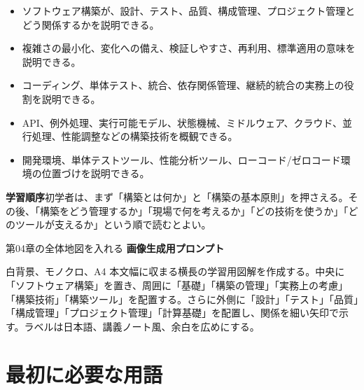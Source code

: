 \documentclass[a4paper,11pt,ja=standard,xelatex]{bxjsarticle}
\begin{document}
\begin{itemize}
  \item ソフトウェア構築が、設計、テスト、品質、構成管理、プロジェクト管理とどう関係するかを説明できる。
  \item 複雑さの最小化、変化への備え、検証しやすさ、再利用、標準適用の意味を説明できる。
  \item コーディング、単体テスト、統合、依存関係管理、継続的統合の実務上の役割を説明できる。
  \item API、例外処理、実行可能モデル、状態機械、ミドルウェア、クラウド、並行処理、性能調整などの構築技術を概観できる。
  \item 開発環境、単体テストツール、性能分析ツール、ローコード/ゼロコード環境の位置づけを説明できる。
\end{itemize}

\noindent\textbf{学習順序}\quad 初学者は、まず「構築とは何か」と「構築の基本原則」を押さえる。その後、「構築をどう管理するか」「現場で何を考えるか」「どの技術を使うか」「どのツールが支えるか」という順で読むとよい。

\begin{todobox}{第04章の全体地図を入れる}
\textbf{画像生成用プロンプト}

白背景、モノクロ、A4 本文幅に収まる横長の学習用図解を作成する。中央に「ソフトウェア構築」を置き、周囲に「基礎」「構築の管理」「実務上の考慮」「構築技術」「構築ツール」を配置する。さらに外側に「設計」「テスト」「品質」「構成管理」「プロジェクト管理」「計算基礎」を配置し、関係を細い矢印で示す。ラベルは日本語、講義ノート風、余白を広めにする。
\end{todobox}

\section*{最初に必要な用語}
\end{document}
